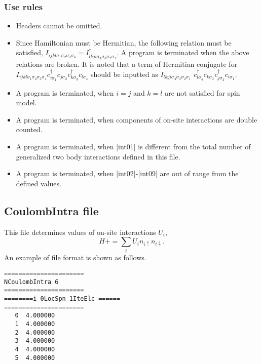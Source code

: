 \subsubsection{Use rules}
\begin{itemize}
\item Headers cannot be omitted. 
\item Since Hamiltonian must be Hermitian, the following relation must be satisfied, $I_{ijkl\sigma_1\sigma_2\sigma_3\sigma_4}=I_{lkji\sigma_4\sigma_3\sigma_2\sigma_1}^{\dag}$. A program is terminated when the above relations are broken.
It is noted that a term of Hermitian conjugate for $I_{ijkl\sigma_1\sigma_2\sigma_3\sigma_4}c_{i\sigma_1}^{\dagger}c_{j\sigma_2}c_{k\sigma_3}^{\dagger}c_{l\sigma_4}$ should be inputted as $I_{lkji\sigma_4\sigma_3\sigma_2\sigma_1}$ $c_{l\sigma_4}^{\dagger}c_{k\sigma_3}c_{j\sigma_2}^{\dagger}c_{i\sigma_1}$.
\item {A program is terminated, when $i=j$ and $k=l$ are not satisfied for spin model.}
\item A program is terminated, when components of on-site interactions are double counted.
\item A program is terminated, when $[$int01$]$ is different from the total number of generalized two body interactions defined in this file.
\item A program is terminated, when $[$int02$]$-$[$int09$]$ are out of range from the defined values.
\end{itemize}

\newpage
\subsection{CoulombIntra file}
This file determines values of on-site interactions $U_i$,
\begin{equation}
H+=\sum_{i}U_i n_ {i \uparrow}n_{i \downarrow}.
\end{equation}
An example of file format is shown as follows.

\begin{minipage}{12.5cm}
\begin{screen}
\begin{verbatim}
====================== 
NCoulombIntra 6  
====================== 
========i_0LocSpn_1IteElc ====== 
====================== 
   0  4.000000
   1  4.000000
   2  4.000000
   3  4.000000
   4  4.000000
   5  4.000000
\end{verbatim}
\end{screen}
\end{minipage}


